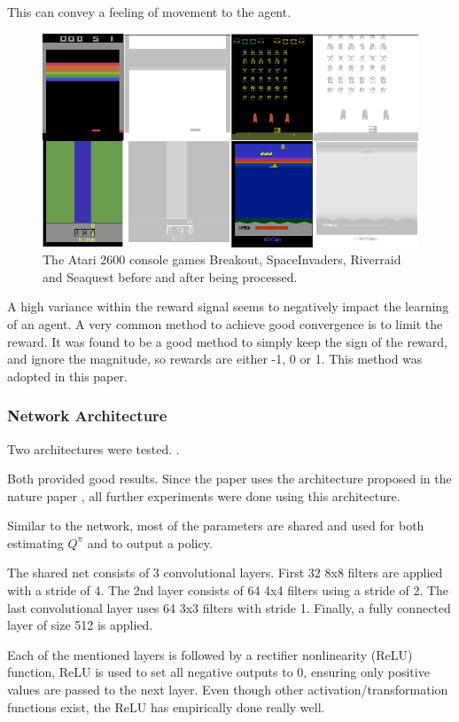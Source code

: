 This can convey a feeling of movement to the agent.

\begin{figure}
\includegraphics[scale=0.5]{bilder/atarienv.png}
\caption{The Atari 2600 console games Breakout, SpaceInvaders, Riverraid and Seaquest before and after being processed.}
\end{figure}

A high variance within the reward signal seems to negatively impact the learning of an agent.
A very common method to achieve good convergence is to limit the reward. 
It was found to be a good method to simply keep the sign of the reward, and ignore the magnitude, so rewards are either -1, 0 or 1. This method was adopted in this paper.


\subsubsection{Network Architecture}

Two architectures were tested. \citep{mnih2015atari} \citep{nature}.

Both provided good results. Since the paper uses the architecture proposed in the nature paper \citep{nature}, all further experiments were done using this architecture.

Similar to the \citep{A3C} network, most of the parameters are shared and used for both estimating $Q^\pi$ and to output a policy.

The shared net consists of 3 convolutional layers.
First 32 8x8 filters are applied with a stride of 4.
The 2nd layer consists of 64 4x4 filters using a stride of 2.
The last convolutional layer uses 64 3x3 filters with stride 1.
Finally, a fully connected layer of size 512 is applied.

Each of the mentioned layers is followed by a rectifier nonlinearity (ReLU) function, ReLU is used to set all negative outputs to 0, ensuring only positive values are passed to the next layer.
Even though other activation/transformation functions exist, the ReLU has empirically done really well. 

